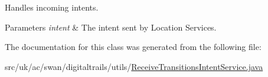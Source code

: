 Handles incoming intents. 


\begin{DoxyParams}{Parameters}
{\em intent} & The intent sent by Location Services. \\
\hline
\end{DoxyParams}


The documentation for this class was generated from the following file\+:\begin{DoxyCompactItemize}
\item 
src/uk/ac/swan/digitaltrails/utils/\hyperlink{_receive_transitions_intent_service_8java}{Receive\+Transitions\+Intent\+Service.\+java}\end{DoxyCompactItemize}
